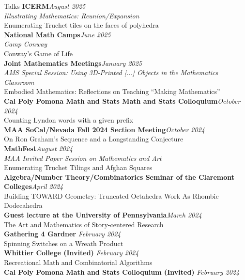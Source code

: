 \documentclass{cv} %
\begin{document}
\begin{rSection}{Talks}
  \textbf{ICERM}\hfill\textit{August 2025}
  \\ \textit{Illustrating Mathematics: Reunion/Expansion}
  \\ Enumerating Truchet tiles on the faces of polyhedra
  \\
  \textbf{National Math Camps}\hfill\textit{June 2025}
  \\ \textit{Camp Conway}
  \\ Conway's Game of Life
  \\
  \textbf{Joint Mathematics Meetings}\hfill\textit{January 2025}
  \\ \textit{AMS Special Session: Using 3D-Printed [...] Objects in the Mathematics Classroom}
  \\ Embodied Mathematics: Reflections on Teaching ``Making Mathematics''
  \\
  \textbf{Cal Poly Pomona Math and Stats Math and Stats Colloquium}\hfill\textit{October 2024}
  \\ Counting Lyndon words with a given prefix
  \\
  \textbf{MAA SoCal/Nevada Fall 2024 Section Meeting}\hfill\textit{October 2024}
  \\ On Ron Graham's Sequence and a Longstanding Conjecture
  \\
  \textbf{MathFest}\hfill\textit{August 2024}
  \\ \textit{MAA Invited Paper Session on Mathematics and Art}
  \\ Enumerating Truchet Tilings and Afghan Squares
  \\
  \textbf{Algebra/Number Theory/Combinatorics Seminar of the Claremont Colleges}\hfill\textit{April 2024}
  \\ Building TOWARD Geometry: Truncated Octahedra Work As Rhombic Dodecahedra
  \\
  \textbf{Guest lecture at the University of Pennsylvania}\hfill\textit{March 2024}
  \\ The Art and Mathematics of Story-centered Research
  \\
  \textbf{Gathering 4 Gardner} \hfill \textit{February 2024}
  \\ Spinning Switches on a Wreath Product
  \\
  \textbf{Whittier College (Invited)} \hfill \textit{February 2024}
  \\ Recreational Math and Combinatorial Algorithms
  \\
  \textbf{Cal Poly Pomona Math and Stats Colloquium (Invited)} \hfill \textit{February 2024}

\end{rSection}
\end{document}
